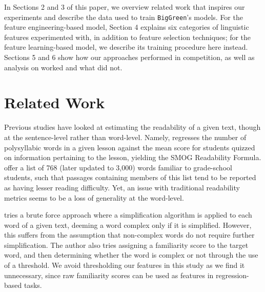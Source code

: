 \documentclass{dcthesis}
\theoremstyle{definition}
\theoremstyle{remark}
\begin{document}
In Sections 2 and 3 of this paper, we overview related work that inspires our experiments and describe the data used to train \texttt{BigGreen}'s models. For the feature engineering-based model, Section 4 explains six categories of linguistic features experimented with, in addition to feature selection techniques; for the feature learning-based model, we describe its training procedure here instead. Sections 5 and 6 show how our approaches performed in competition, as well as analysis on worked and what did not.

\chapter{Related Work}

Previous studies have looked at estimating the readability of a given text, though at the sentence-level rather than word-level. Namely, \citet{mc1969smog} regresses the number of polysyllabic words in a given lesson against the mean score for students quizzed on information pertaining to the lesson, yielding the SMOG Readability Formula. \citet{dale1948formula} offer a list of 768 (later updated to 3,000) words familiar to grade-school students, such that passages containing members of this list tend to be reported as having lesser reading difficulty. Yet, an issue with traditional readability metrics seems to be a loss of generality at the word-level.

\citet{shardlow2013comparison} tries a brute force approach where a simplification algorithm is applied to each word of a given text, deeming a word complex only if it is simplified. However, this suffers from the assumption that non-complex words do not require further simplification. The author also tries assigning a familiarity score to the target word, and then determining whether the word is complex or not through the use of a threshold. We avoid thresholding our features in this study as we find it unnecessary, since raw familiarity scores can be used as features in regression-based tasks. 
\end{document}
